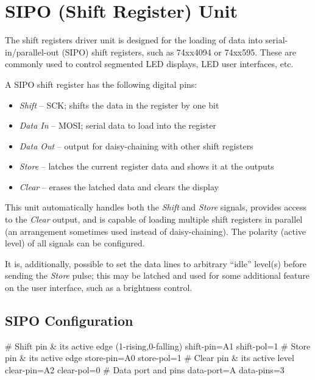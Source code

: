 \section{SIPO (Shift Register) Unit}

The shift registers driver unit is designed for the loading of data into serial-in/parallel-out (SIPO) shift registers, such as 74xx4094 or 74xx595. These are commonly used to control segmented \gls{LED} displays, \gls{LED} user interfaces, etc.

\noindent
A SIPO shift register has the following digital pins:

\begin{itemize}[itemsep=0pt]
	\item \textit{Shift} -- \gls{SCK}; shifts the data in the register by one bit
	\item \textit{Data In} -- \gls{MOSI}; serial data to load into the register
	\item \textit{Data Out} -- output for daisy-chaining with other shift registers
	\item \textit{Store} -- latches the current register data and shows it at the outputs
	\item \textit{Clear} -- erases the latched data and clears the display
\end{itemize}

This unit automatically handles both the \textit{Shift} and \textit{Store} signals, provides access to the \textit{Clear} output, and is capable of loading multiple shift registers in parallel (an arrangement sometimes used instead of daisy-chaining). The polarity (active level) of all signals can be configured.

It is, additionally, possible to set the data lines to arbitrary ``idle'' level(s) before sending the \textit{Store} pulse; this may be latched and used for some additional feature on the user interface, such as a brightness control.


\subsection{SIPO Configuration}

\begin{inicode}
# Shift pin & its active edge (1-rising,0-falling)
shift-pin=A1
shift-pol=1
# Store pin & its active edge
store-pin=A0
store-pol=1
# Clear pin & its active level
clear-pin=A2
clear-pol=0
# Data port and pins
data-port=A
data-pins=3
\end{inicode}

